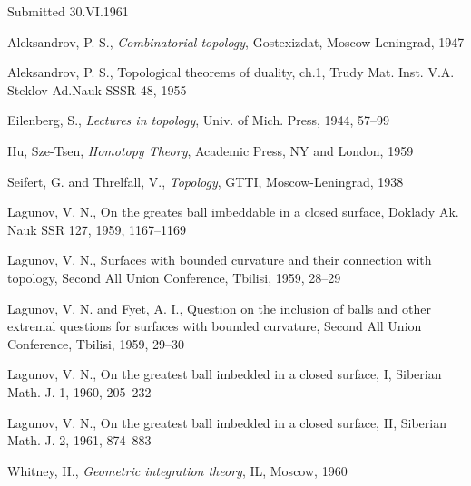 \documentclass{amsart}
\theoremstyle{plain}
\theoremstyle{definition}
\begin{document}
\noindent Submitted 30.VI.1961

\begin{thebibliography}{LF}
 Aleksandrov, P. S., {\em  Combinatorial topology},
 Gostexizdat, Moscow-Leningrad, 1947


 Aleksandrov, P. S., Topological theorems
of duality, ch.1, Trudy Mat. Inst. V.A. Steklov Ad.Nauk SSSR
 48, 1955


 Eilenberg, S., {\em  Lectures in topology},
Univ. of Mich. Press, 1944, 57--99


 Hu, Sze-Tsen, {\em  Homotopy Theory},
Academic Press, NY and London, 1959


 Seifert, G. and Threlfall, V., {\em  Topology},
GTTI, Moscow-Leningrad, 1938


 Lagunov, V. N., On the greates ball
imbeddable in a closed surface, Doklady Ak. Nauk SSR
 127, 1959, 1167--1169


 Lagunov, V. N., Surfaces with bounded
curvature and their connection with topology, Second
All Union Conference, Tbilisi, 1959, 28--29


 Lagunov, V. N. and Fyet, A. I., Question
on the inclusion of balls and other extremal questions for
surfaces with bounded curvature, Second All Union
Conference, Tbilisi, 1959, 29--30


 Lagunov, V. N., On the greatest ball
imbedded in a closed surface, I, Siberian Math. J.
 1, 1960, 205--232


 Lagunov, V. N., On the greatest ball
imbedded in a closed surface, II, Siberian Math. J.
 2, 1961, 874--883


 Whitney, H., {\em  Geometric integration theory},
IL, Moscow, 1960

\end{thebibliography}
\end{document}

